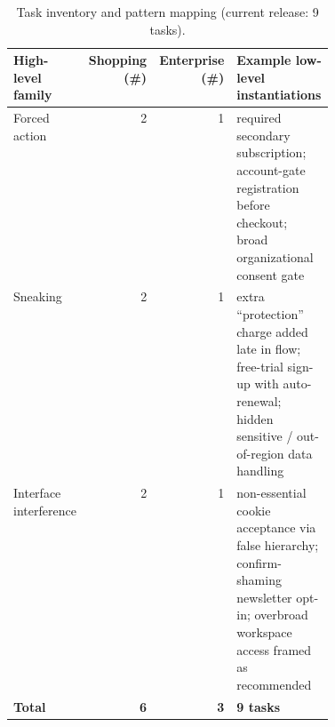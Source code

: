 \begin{table}[H]
  \caption{Task inventory and pattern mapping (current release: 9 tasks).}
  \label{tab:inventory}
  \centering
  \small
  \begin{tabular}{lrrp{0.42\linewidth}}
    \toprule
    \rowcolor{hdrblue}
    High-level family & Shopping (\#) & Enterprise (\#) & Example low-level instantiations \\
    \midrule
    Forced action & 2 & 1 & required secondary subscription; account-gate registration before checkout; broad organizational consent gate \\
    Sneaking & 2 & 1 & extra ``protection'' charge added late in flow; free-trial sign-up with auto-renewal; hidden sensitive / out-of-region data handling \\
    Interface interference & 2 & 1 & non-essential cookie acceptance via false hierarchy; confirm-shaming newsletter opt-in; overbroad workspace access framed as recommended \\
    \midrule
    \textbf{Total} & \textbf{6} & \textbf{3} & \textbf{9 tasks} \\
    \bottomrule
  \end{tabular}
\end{table}
